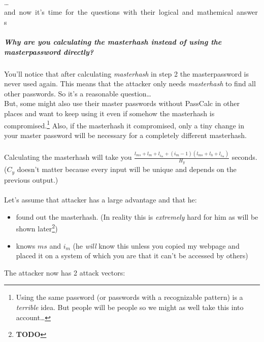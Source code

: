 \documentclass[11pt]{article}
\begin{document}
\paragraph*{}
\ldots\mbox{and now it's time for the questions with their logical and mathemical answers}

\subparagraph{Why are you calculating the masterhash instead of using the masterpassword directly?\\}
You'll notice that after calculating \emph{masterhash} in step 2 the masterpassword is never used again. This means that the attacker only needs \emph{masterhash} to find all other passwords. So it's a reasonable question\ldots\\But, some might also use their master passwords without PassCalc in other places and want to keep using it even if somehow the masterhash is compromised.\footnote{Using the same password (or passwords with a recognizable pattern) is a \emph{terrible} idea. But people will be people so we might as well take this into account\ldots} Also, if the masterhash it compromised, only a tiny change in your master password will be necessary for a completely different masterhash.
\\\\Calculating the masterhash will take you $\frac{l_{ms}+l_m+l_{i_m}+(i_m-1)(l_{ms}+l_h+l_{i_m})}{H_y}$ seconds. ($C_y$ doesn't matter because every input will be unique and depends on the previous output.)
\\\\Let's assume that attacker has a large advantage and that he:
\begin{itemize}
\item found out the masterhash. (In reality this is \emph{extremely} hard for him as will be shown later\footnote{\textbf{TODO}})
\item knows $ms$ and $i_m$ (he \emph{will} know this unless you copied my webpage and placed it on a system of which you are that it can't be accessed by others)
\end{itemize}
The attacker now has 2 attack vectors:
\end{document}
